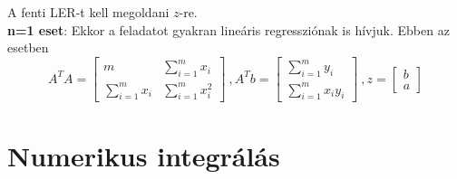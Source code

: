 \documentclass[margin=0px]{article}
\begin{document}
\noindent A fenti LER-t kell megoldani $z$-re.\\

\noindent \textbf{n=1 eset}: Ekkor a feladatot gyakran lineáris regressziónak is hívjuk. Ebben az esetben
\begin{displaymath}
    A^{T}A = \begin{bmatrix}
        m                    & \sum_{i=1}^{m} x_{i}     \\[0.3em]
        \sum_{i=1}^{m} x_{i} & \sum_{i=1}^{m} x_{i}^{2}
    \end{bmatrix} \ ,
    A^{T}b = \begin{bmatrix}
        \sum_{i=1}^{m} y_{i} \\[0.3em]
        \sum_{i=1}^{m} x_{i}y_ {i}
    \end{bmatrix} \ ,
    z= \begin{bmatrix}
        b \\[0.3em]
        a
    \end{bmatrix}
\end{displaymath}

\section{Numerikus integrálás}


\end{document}
